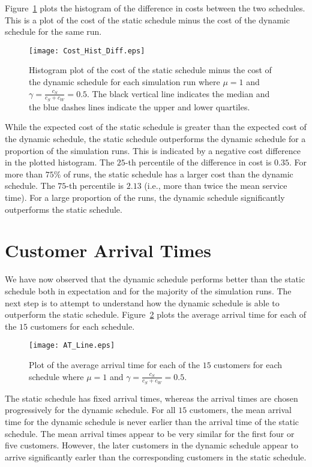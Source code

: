 Figure~\ref{fig:Diff_Cost} plots the histogram of the difference in costs between the two schedules. This is a plot of the cost of the static schedule minus the cost of the dynamic schedule for the same run.
\begin{figure}[htb]
	\centering
	\texttt{[image: Cost\_Hist\_Diff.eps]}
	\caption{Histogram plot of the cost of the static schedule minus the cost of the dynamic schedule for each simulation run where $\mu = 1$ and $\gamma = \frac{c_{S}}{c_{S} + c_{W}} = 0.5$. The black vertical line indicates the median and the blue dashes lines indicate the upper and lower quartiles.}
	\label{fig:Diff_Cost}
\end{figure}

While the expected cost of the static schedule is greater than the expected cost of the dynamic schedule, the static schedule outperforms the dynamic schedule for a proportion of the simulation runs. This is indicated by a negative cost difference in the plotted histogram. The $25$-th percentile of the difference in cost is $0.35$. For more than $75 \%$ of runs, the static schedule has a larger cost than the dynamic schedule. The $75$-th percentile is $2.13$ (i.e., more than twice the mean service time). For a large proportion of the runs, the dynamic schedule significantly outperforms the static schedule.

\section{Customer Arrival Times}
We have now observed that the dynamic schedule performs better than the static schedule both in expectation and for the majority of the simulation runs. The next step is to attempt to understand how the dynamic schedule is able to outperform the static schedule. Figure~\ref{fig:Avg_Arrival} plots the average arrival time for each of the $15$ customers for each schedule.
\begin{figure}[htb]
	\centering
	\texttt{[image: AT\_Line.eps]}
	\caption{Plot of the average arrival time for each of the $15$ customers for each schedule where $\mu = 1$ and $\gamma = \frac{c_{S}}{c_{S} + c_{W}} = 0.5$.}
	\label{fig:Avg_Arrival}
\end{figure}

The static schedule has fixed arrival times, whereas the arrival times are chosen progressively for the dynamic schedule. For all $15$ customers, the mean arrival time for the dynamic schedule is never earlier than the arrival time of the static schedule. The mean arrival times appear to be very similar for the first four or five customers. However, the later customers in the dynamic schedule appear to arrive significantly earler than the corresponding customers in the static schedule.

